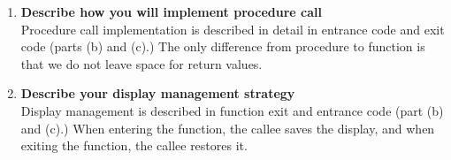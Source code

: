 \documentclass[11pt]{article}
\begin{document}
\begin{enumerate}[label=(\alph*)]
\item \textbf{Describe how you will implement procedure call}\\
Procedure call implementation is described in detail in entrance code and exit
code (parts (b) and (c).) The only difference from procedure to function is
that we do not leave space for return values.

\item \textbf{Describe your display management strategy}\\
Display management is described in function exit and entrance code (part (b)
and (c).) When entering the function, the callee saves the display, and when
exiting the function, the callee restores it.
\end{enumerate}

\end{document}
